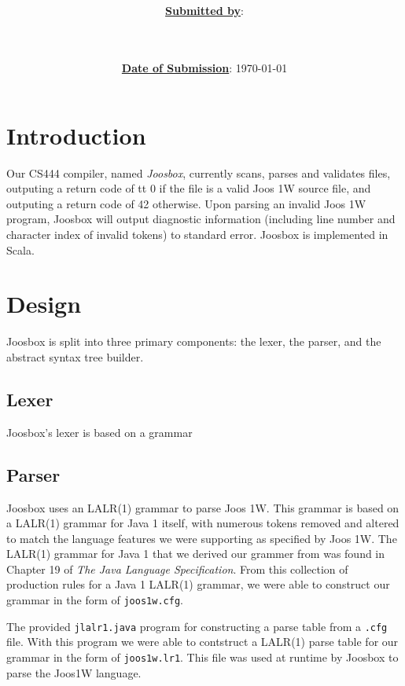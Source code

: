 \documentclass[letterpaper]{article}
\title{\course \\ \term \\ \project}
\date{\ul{\textbf{Date of Submission}}: \today}
\author{\ul{\textbf{Submitted by}}: \\ \indent \wenhao \\ \indent \chris \\ \indent \peter}
\begin{document}
  \maketitle
  \thispagestyle{empty}
  \clearpage

  \tableofcontents
  \thispagestyle{empty}
  \clearpage

  \setcounter{page}{1}

  \clearpage
  \section{Introduction}

  Our CS444 compiler, named {\em Joosbox}, currently scans, parses and
  validates files, outputing a return code of {tt 0} if the file is a valid
  Joos 1W source file, and outputing a return code of 42 otherwise. Upon
  parsing an invalid Joos 1W program, Joosbox will output diagnostic
  information (including line number and character index of invalid tokens) to
  standard error. Joosbox is implemented in Scala.

  \section{Design}

  Joosbox is split into three primary components: the lexer, the parser, and
  the abstract syntax tree builder.

  \subsection{Lexer}

  Joosbox's lexer is based on a grammar

  \subsection{Parser}

  Joosbox uses an LALR(1) grammar to parse Joos 1W. This grammar is based on a
  LALR(1) grammar for Java 1 itself, with numerous tokens removed and altered to
  match the language features we were supporting as specified by Joos 1W. The
  LALR(1) grammar for Java 1 that we derived our grammer from was found in
  Chapter 19 of {\em The Java Language Specification}. From this collection of
  production rules for a Java 1 LALR(1) grammar, we were able to construct our
  grammar in the form of {\tt joos1w.cfg}.

  The provided {\tt jlalr1.java} program for constructing a parse table from a
  {\tt .cfg} file. With this program we were able to contstruct a LALR(1) parse
  table for our grammar in the form of {\tt joos1w.lr1}. This file was used at
  runtime by Joosbox to parse the Joos1W language.
\end{document}
